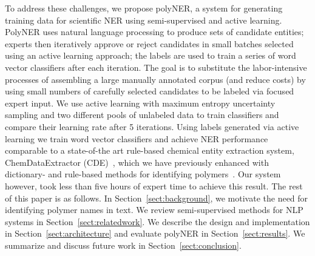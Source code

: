 To address these challenges, we propose polyNER, a system for generating training data for scientific NER using semi-supervised and active learning. 
PolyNER uses natural language processing to produce sets of candidate entities;
experts then iteratively approve or reject candidates in small batches selected using an active learning approach;
the labels are used to train a series of word vector classifiers after each iteration.
The goal is
to substitute the labor-intensive processes of assembling a large
manually annotated corpus (and reduce costs) by using small numbers of carefully selected candidates to be labeled via focused expert input. 
We use active learning with maximum entropy uncertainty sampling and two different pools of unlabeled data to train classifiers and compare their learning rate after 5 iterations. 
Using labels generated via active learning we train word vector classifiers and achieve NER performance comparable to 
a state-of-the art rule-based chemical entity extraction
system, ChemDataExtractor (CDE)~\cite{swain2016chemdataextractor}, which we have previously enhanced
with dictionary- and rule-based methods for identifying polymers~\cite{tchoua2017towards}.
Our system however, took less than five hours of expert time to achieve this result.
The rest of this paper is as follows. 
In Section~\ref{sect:background}, we motivate the need for identifying polymer names in
text. 
We review semi-supervised methods for NLP systems in
Section~\ref{sect:relatedwork}. 
We describe the design and implementation in Section~\ref{sect:architecture} and evaluate polyNER
in Section~\ref{sect:results}. We summarize and discuss future work in Section~\ref{sect:conclusion}.